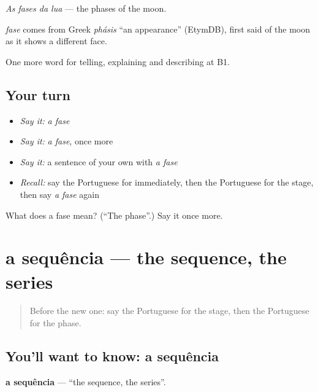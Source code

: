 \emph{As fases da lua} — the phases of the moon.

\begin{cousinweb}
\emph{fase} comes from Greek \emph{phásis} \textquotedblleft{}an appearance\textquotedblright{} (EtymDB), first said of the moon as it shows a different face.
\end{cousinweb}

\begin{grammarlens}[title={What you've built}]
One more word for telling, explaining and describing at B1.
\end{grammarlens}

\subsection*{Your turn}
\begin{itemize}
\raggedright
  \item \emph{Say it:} \emph{a fase}
  \item \emph{Say it:} \emph{a fase}, once more
  \item \emph{Say it:} a sentence of your own with \emph{a fase}
  \item \emph{Recall:} say the Portuguese for immediately, then the Portuguese for the stage, then say \emph{a fase} again
\end{itemize}

\begin{tcolorbox}[breakable,colback=teal!4,colframe=teal!35!black,title={Before you move on}]
What does a fase mean? (\textquotedblleft{}The phase\textquotedblright{}.) Say it once more.
\end{tcolorbox}
\section[a sequência]{a sequência — the sequence, the series}

\label{lesson:PT-C273-sequencia}



\begin{quote}
Before the new one: say the Portuguese for the stage, then the Portuguese for the phase.
\end{quote}

\subsection*{You'll want to know: a sequência}
\textbf{a sequência} — \textquotedblleft{}the sequence, the series\textquotedblright{}.

